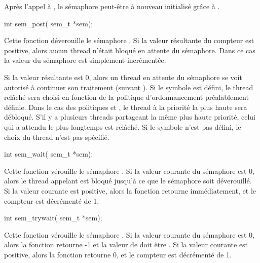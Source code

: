 Après l'appel à , le sémaphore peut-être à nouveau initialisé grâce à .

\label{func:sem_post}

\begin{codeblock}
int sem_post(
    sem_t *sem);
\end{codeblock}

Cette fonction déverouille le sémaphore . Si la valeur résultante du compteur est positive, alors aucun thread n'était bloqué en attente du sémaphore. Dans ce cas la valeur du sémaphore est simplement incrémentée.

Si la valeur résultante est 0, alors un thread en attente du sémaphore se voit autorisé à continuer son traitement (suivant ). Si le symbole  est défini, le thread relâché sera choisi en fonction de la politique d'ordonnancement préalablement définie. Dans le cas des politiques  et , le thread à la priorité la plus haute sera débloqué. S'il y a plusieurs threads partageant la même plus haute priorité, celui qui a attendu le plus longtemps est relâché. Si le symbole  n'est pas défini, le choix du thread n'est pas spécifié.

\label{func:sem_wait}

\begin{codeblock}
int sem_wait(
    sem_t *sem);
\end{codeblock}

Cette fonction vérouille le sémaphore . Si la valeur courante du sémaphore est 0, alors le thread appelant est bloqué jusqu'à ce que le sémaphore soit déverouillé. Si la valeur courante est positive, alors la fonction retourne immédiatement, et le compteur est décrémenté de 1.


\label{func:sem_trywait}

\begin{codeblock}
int sem_trywait(
    sem_t *sem);
\end{codeblock}
Cette fonction vérouille le sémaphore . Si la valeur courante du sémaphore est 0, alors la fonction retourne -1 et la valeur de  doit être . Si la valeur courante est positive, alors la fonction retourne 0, et le compteur est décrémenté de 1.


\label{func:sem_getvalue}

